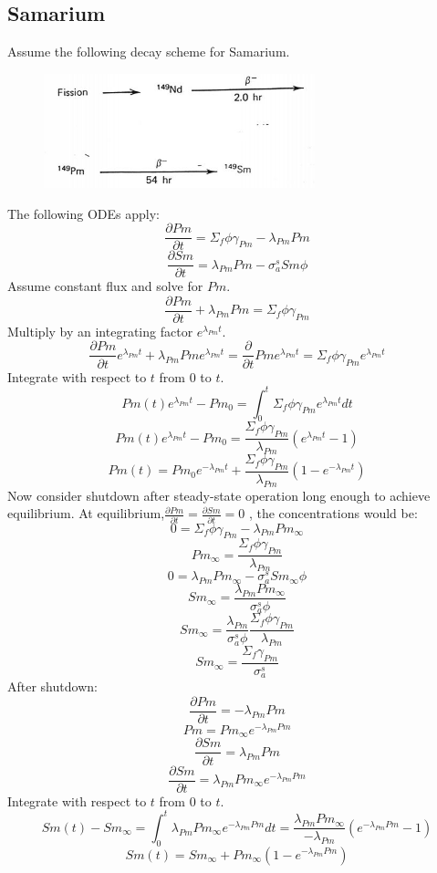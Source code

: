 \documentclass[]{article}
\begin{document}
		\subsection*{\textbf{Samarium}}
		Assume the following decay scheme for Samarium.
		\begin{figure}[H]\centering
			\includegraphics[width=0.7\textwidth]{Samarium.jpg}
		\end{figure}
		The following ODEs apply:
		\[
		\frac{\partial Pm}{\partial t} = \Sigma_f \phi \gamma_{Pm} - \lambda_{Pm}Pm
		\]
		\[
		\frac{\partial Sm}{\partial t} =  \lambda_{Pm}Pm - \sigma_a^s Sm \phi 
		\]
		Assume constant flux and solve for $Pm$.
		\[
		\frac{\partial Pm}{\partial t} + \lambda_{Pm}Pm = \Sigma_f \phi \gamma_{Pm}  
		\]
		Multiply by an integrating factor $e^{\lambda_{Pm}t}$.
		\[
		\frac{\partial Pm}{\partial t}e^{\lambda_{Pm}t} + \lambda_{Pm}Pme^{\lambda_{Pm}t} =\frac{\partial}{\partial t}Pme^{\lambda_{Pm}t} =\Sigma_f \phi \gamma_{Pm}e^{\lambda_{Pm}t}  
		\]
		Integrate with respect to $t$ from 0 to $t$. 
		\[
		Pm(t)e^{\lambda_{Pm}t} -Pm_0 =\int_{0}^{t}\Sigma_f \phi \gamma_{Pm}e^{\lambda_{Pm}t}dt  
		\]
		\[
		Pm(t)e^{\lambda_{Pm}t} -Pm_0 =\frac{\Sigma_f \phi \gamma_{Pm}}{\lambda_{Pm}}(e^{\lambda_{Pm}t}-1)  
		\]
		\[
		Pm(t) = Pm_0e^{-\lambda_{Pm}t}+\frac{\Sigma_f \phi \gamma_{Pm}}{\lambda_{Pm}}(1-e^{-\lambda_{Pm}t})  
		\]
		Now consider shutdown after steady-state operation long enough to achieve equilibrium. At equilibrium,$\frac{\partial Pm}{\partial t} = \frac{\partial Sm}{\partial t} = 0$ , the concentrations would be:
		\[
		0 = \Sigma_f \phi \gamma_{Pm} - \lambda_{Pm}Pm_\infty
		\]
		\[
		Pm_\infty = \frac{\Sigma_f \phi \gamma_{Pm}}{\lambda_{Pm}}
		\]
		\[
		0 =  \lambda_{Pm}Pm_\infty - \sigma_a^s Sm_\infty \phi 
		\]
		\[
		Sm_\infty =  \frac{\lambda_{Pm}Pm_\infty}{\sigma_a^s\phi} 
		\]
		\[
		Sm_\infty =  \frac{\lambda_{Pm}}{\sigma_a^s\phi}\frac{\Sigma_f \phi \gamma_{Pm}}{\lambda_{Pm}} 
		\]
		\[
		Sm_\infty = \frac{\Sigma_f \gamma_{Pm}}{\sigma_a^s}
		\]
		After shutdown:
		\[
		\frac{\partial Pm}{\partial t} = -\lambda_{Pm} Pm
		\]
		\[
		Pm = Pm_\infty e^{-\lambda_{Pm} Pm}
		\]
		\[
		\frac{\partial Sm}{\partial t} = \lambda_{Pm} Pm
		\]
		\[
		\frac{\partial Sm}{\partial t} = \lambda_{Pm} Pm_\infty e^{-\lambda_{Pm} Pm}
		\]
		Integrate with respect to $t$ from 0 to $t$.
		\[
		Sm(t)-Sm_\infty = \int_{0}^{t}\lambda_{Pm} Pm_\infty e^{-\lambda_{Pm} Pm}dt= \frac{\lambda_{Pm} Pm_\infty}{-\lambda_{Pm}}(e^{-\lambda_{Pm} Pm}-1 )
		\]
		\[
		Sm(t)=Sm_\infty+ Pm_\infty(1-e^{-\lambda_{Pm} Pm})
		\]
\end{document}

